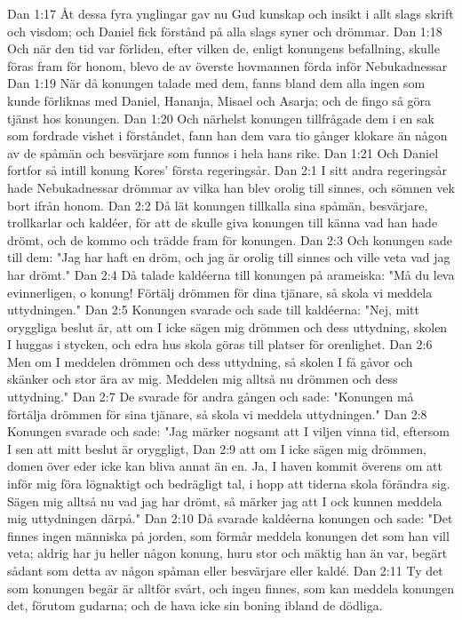 Dan 1:17  Åt dessa fyra ynglingar gav nu Gud kunskap och insikt i allt slags skrift och visdom; och Daniel fick förstånd på alla slags syner och drömmar.
Dan 1:18  Och när den tid var förliden, efter vilken de, enligt konungens befallning, skulle föras fram för honom, blevo de av överste hovmannen förda inför Nebukadnessar
Dan 1:19  När då konungen talade med dem, fanns bland dem alla ingen som kunde förliknas med Daniel, Hananja, Misael och Asarja; och de fingo så göra tjänst hos konungen.
Dan 1:20  Och närhelst konungen tillfrågade dem i en sak som fordrade vishet i förståndet, fann han dem vara tio gånger klokare än någon av de spåmän och besvärjare som funnos i hela hans rike.
Dan 1:21  Och Daniel fortfor så intill konung Kores' första regeringsår.
Dan 2:1  I sitt andra regeringsår hade Nebukadnessar drömmar av vilka han blev orolig till sinnes, och sömnen vek bort ifrån honom.
Dan 2:2  Då lät konungen tillkalla sina spåmän, besvärjare, trollkarlar och kaldéer, för att de skulle giva konungen till känna vad han hade drömt, och de kommo och trädde fram för konungen.
Dan 2:3  Och konungen sade till dem: "Jag har haft en dröm, och jag är orolig till sinnes och ville veta vad jag har drömt."
Dan 2:4  Då talade kaldéerna till konungen på arameiska: "Må du leva evinnerligen, o konung! Förtälj drömmen för dina tjänare, så skola vi meddela uttydningen."
Dan 2:5  Konungen svarade och sade till kaldéerna: "Nej, mitt oryggliga beslut är, att om I icke sägen mig drömmen och dess uttydning, skolen I huggas i stycken, och edra hus skola göras till platser för orenlighet.
Dan 2:6  Men om I meddelen drömmen och dess uttydning, så skolen I få gåvor och skänker och stor ära av mig. Meddelen mig alltså nu drömmen och dess uttydning."
Dan 2:7  De svarade för andra gången och sade: "Konungen må förtälja drömmen för sina tjänare, så skola vi meddela uttydningen."
Dan 2:8  Konungen svarade och sade: "Jag märker nogsamt att I viljen vinna tid, eftersom I sen att mitt beslut är oryggligt,
Dan 2:9  att om I icke sägen mig drömmen, domen över eder icke kan bliva annat än en. Ja, I haven kommit överens om att inför mig föra lögnaktigt och bedrägligt tal, i hopp att tiderna skola förändra sig. Sägen mig alltså nu vad jag har drömt, så märker jag att I ock kunnen meddela mig uttydningen därpå."
Dan 2:10  Då svarade kaldéerna konungen och sade: "Det finnes ingen människa på jorden, som förmår meddela konungen det som han vill veta; aldrig har ju heller någon konung, huru stor och mäktig han än var, begärt sådant som detta av någon spåman eller besvärjare eller kaldé.
Dan 2:11  Ty det som konungen begär är alltför svårt, och ingen finnes, som kan meddela konungen det, förutom gudarna; och de hava icke sin boning ibland de dödliga.
